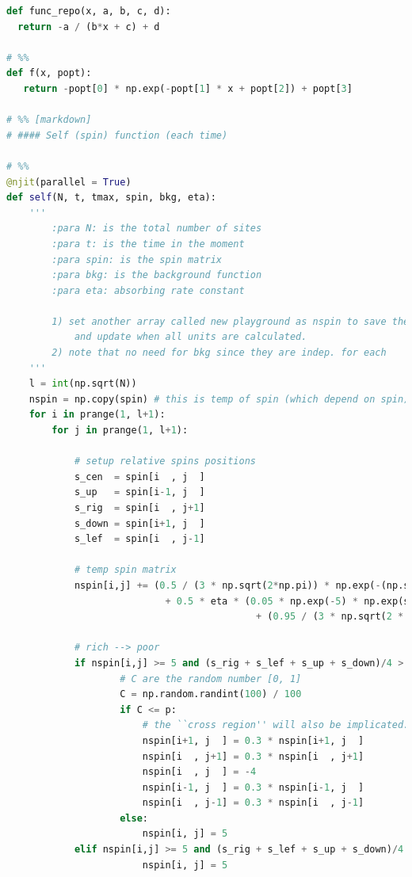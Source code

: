 \documentclass[10pt]{article}
\begin{document}
\begin{lstlisting}[language={Python}]
def func_repo(x, a, b, c, d):
  return -a / (b*x + c) + d

# %%
def f(x, popt):
   return -popt[0] * np.exp(-popt[1] * x + popt[2]) + popt[3]

# %% [markdown]
# #### Self (spin) function (each time)

# %%
@njit(parallel = True)
def self(N, t, tmax, spin, bkg, eta):
    '''
        :para N: is the total number of sites
        :para t: is the time in the moment
        :para spin: is the spin matrix
        :para bkg: is the background function
        :para eta: absorbing rate constant

        1) set another array called new playground as nspin to save the new Hierarchy, 
            and update when all units are calculated.
        2) note that no need for bkg since they are indep. for each
    '''
    l = int(np.sqrt(N))
    nspin = np.copy(spin) # this is temp of spin (which depend on spin)
    for i in prange(1, l+1):
        for j in prange(1, l+1):

            # setup relative spins positions
            s_cen  = spin[i  , j  ]
            s_up   = spin[i-1, j  ]
            s_rig  = spin[i  , j+1]
            s_down = spin[i+1, j  ]
            s_lef  = spin[i  , j-1]

            # temp spin matrix
            nspin[i,j] += (0.5 / (3 * np.sqrt(2*np.pi)) * np.exp(-(np.square(s_cen)/(2 * np.square(3)))) * (-(4*s_cen - s_rig -s_lef - s_up - s_down))
                            + 0.5 * eta * (0.05 * np.exp(-5) * np.exp(s_cen)
                                            + (0.95 / (3 * np.sqrt(2 * np.pi))) * np.exp(-np.square(s_cen)/(2 * np.square(3)))) * bkg[i,j] * np.sin(2 * np.pi * t/tmax))
                            
            # rich --> poor
            if nspin[i,j] >= 5 and (s_rig + s_lef + s_up + s_down)/4 > 4:
                    # C are the random number [0, 1]
                    C = np.random.randint(100) / 100
                    if C <= p:
                        # the ``cross region'' will also be implicated.
                        nspin[i+1, j  ] = 0.3 * nspin[i+1, j  ] 
                        nspin[i  , j+1] = 0.3 * nspin[i  , j+1]
                        nspin[i  , j  ] = -4
                        nspin[i-1, j  ] = 0.3 * nspin[i-1, j  ]
                        nspin[i  , j-1] = 0.3 * nspin[i  , j-1]
                    else:
                        nspin[i, j] = 5
            elif nspin[i,j] >= 5 and (s_rig + s_lef + s_up + s_down)/4 <= 4:
                        nspin[i, j] = 5


\end{lstlisting}
\end{document}
